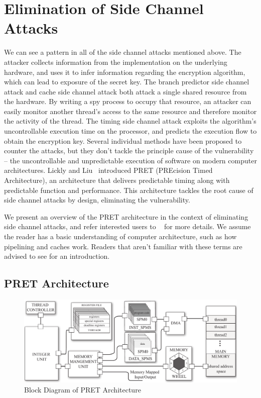 \documentclass[times, 10pt,twocolumn]{article}
\begin{document}
\section{Elimination of Side Channel Attacks}
We can see a pattern in all of the side channel attacks mentioned above. The attacker collects information from the implementation on the underlying hardware, and uses it to infer information regarding the encryption algorithm, which can lead to exposure of the secret key. The branch predictor side channel attack and cache side channel attack both attack a single shared resource from the hardware. By writing a spy process to occupy that resource, an attacker can easily monitor another thread's access to the same resource and therefore monitor the activity of the thread. The timing side channel attack exploits the algorithm's uncontrollable execution time on the processor, and predicts the execution flow to obtain the encryption key. Several individual methods have been proposed to counter the attacks, but they don't tackle the principle cause of the vulnerability -- the uncontrollable and unpredictable execution of software on modern computer architectures. Lickly and Liu~\cite{pret_cases08} introduced PRET (PREcision Timed Architecture), an architecture that delivers predictable timing along with predictable function and performance. This architecture tackles the root cause of side channel attacks by design, eliminating the vulnerability.

We present an overview of the PRET architecture in the context of eliminating side channel attacks, and refer interested users to ~\cite{pret_cases08} for more details. We assume the reader has a basic understanding of computer architecture, such as how pipelining and caches work. Readers that aren't familiar with these terms are advised to see \cite{patterson2005coa} for an introduction.

\subsection{PRET Architecture}

\begin{figure}[ht]
  \centering
  \includegraphics[scale=.25]{./images/top_arch.pdf}
  \caption{Block Diagram of PRET Architecture}
  \label{fig:top_arch}
\end{figure}
\end{document}
